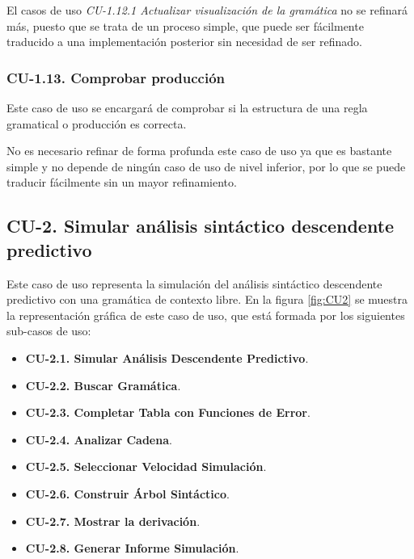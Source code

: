  El casos de uso \textit{CU-1.12.1 Actualizar visualización de la gramática} no se refinará más, puesto que se trata de un proceso simple, que puede ser fácilmente traducido a una  implementación posterior sin necesidad de ser refinado.

 \subsubsection{CU-1.13. Comprobar producción}

 Este caso de uso se encargará de comprobar si la estructura de una regla gramatical o producción es correcta. 

 No es necesario refinar de forma profunda este caso de uso ya que es bastante simple y no depende de ningún caso de uso de nivel inferior, por lo que se puede traducir fácilmente sin un mayor refinamiento.

 \subsection{CU-2. Simular análisis sintáctico descendente predictivo}

Este caso de uso representa la simulación del análisis sintáctico descendente predictivo con una gramática de contexto libre. En la figura \ref{fig:CU2} se muestra la representación gráfica de este caso de uso, que está formada por los siguientes sub-casos de uso:

 \begin{itemize}
  \item \textbf{CU-2.1. Simular Análisis Descendente Predictivo}.
  \item \textbf{CU-2.2. Buscar Gramática}.
  \item \textbf{CU-2.3. Completar Tabla con Funciones de Error}.
  \item \textbf{CU-2.4. Analizar Cadena}.
  \item \textbf{CU-2.5. Seleccionar Velocidad Simulación}.
  \item \textbf{CU-2.6. Construir Árbol Sintáctico}.
  \item \textbf{CU-2.7. Mostrar la derivación}.
  \item \textbf{CU-2.8. Generar Informe Simulación}.
 \end{itemize}

